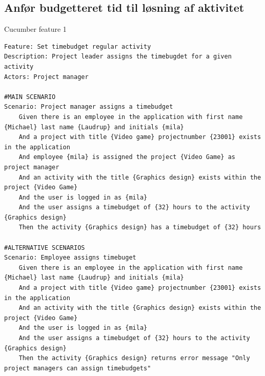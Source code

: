 \subsection{Anfør budgetteret tid til løsning af aktivitet}
\begin{listing}[H]
    \centering
    \caption{Cucumber feature 1}\label{lst:feature1}
    \begin{verbatim}
Feature: Set timebudget regular activity
Description: Project leader assigns the timebugdet for a given activity
Actors: Project manager

#MAIN SCENARIO
Scenario: Project manager assigns a timebudget
    Given there is an employee in the application with first name {Michael} last name {Laudrup} and initials {mila}
    And a project with title {Video game} projectnumber {23001} exists in the application
    And employee {mila} is assigned the project {Video Game} as project manager
    And an activity with the title {Graphics design} exists within the project {Video Game}
    And the user is logged in as {mila}
    And the user assigns a timebudget of {32} hours to the activity {Graphics design}
    Then the activity {Graphics design} has a timebudget of {32} hours

#ALTERNATIVE SCENARIOS
Scenario: Employee assigns timebuget
    Given there is an employee in the application with first name {Michael} last name {Laudrup} and initials {mila}
    And a project with title {Video game} projectnumber {23001} exists in the application
    And an activity with the title {Graphics design} exists within the project {Video Game}
    And the user is logged in as {mila}
    And the user assigns a timebudget of {32} hours to the activity {Graphics design}
    Then the activity {Graphics design} returns error message "Only project managers can assign timebudgets"
    \end{verbatim}
\end{listing}
